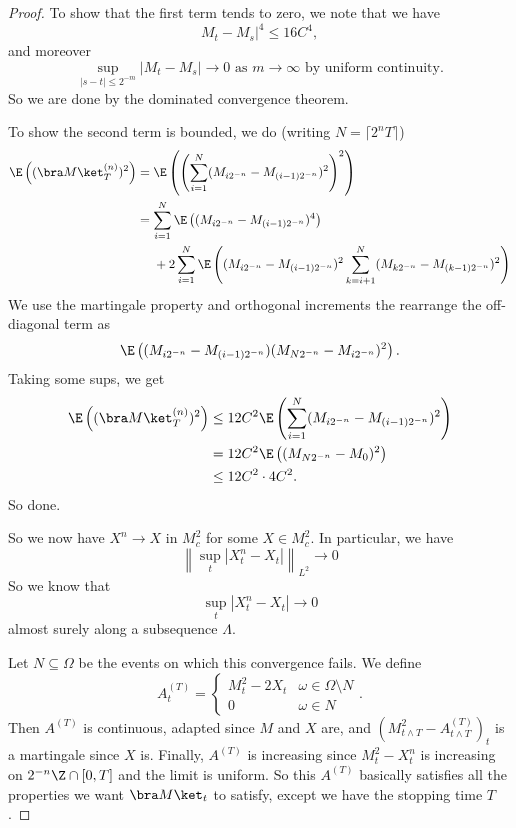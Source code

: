 \documentclass[a4paper]{article}
\begin{document}
\begin{proof}
  To show that the first term tends to zero, we note that we have
  \[
    M_t - M_s|^4 \leq 16 C^4,
  \]
  and moreover
  \[
    \sup_{|s - t| \leq 2^{-m}} |M_t - M_s| \to 0\text{ as }m \to \infty\text{ by uniform continuity}.
  \]
  So we are done by the dominated convergence theorem.

  To show the second term is bounded, we do (writing $N = \lceil 2^n T\rceil$)
  \begin{align*}
    \E\left((\bra M\ket_T^{(n)})^2\right) &= \E \left(\left(\sum_{i = 1}^{N} (M_{i 2^{-n}} - M_{(i - 1)2^{-n}})^2 \right)^2\right)\\
    &= \sum_{i = 1}^N \E \left( (M_{i 2^{-n}}- M_{(i - 1)2^{-n}})^4\right) \\
    &\hphantom{ {}={}} + 2 \sum_{i = 1}^N\E \left((M_{i 2^{-n}} - M_{(i - 1)2^{-n}})^2 \sum_{k = i + 1}^N (M_{k2^{-n}} - M_{(k - 1)2^{-n}})^2\right)
  \end{align*}
  We use the martingale property and orthogonal increments the rearrange the off-diagonal term as
  \[
    \E\left((M_{i2^{-n}} - M_{(i - 1)2^{-n}})(M_{N2^{-n}} - M_{i 2^{-n}})^2\right).
  \]
  Taking some sups, we get
  \begin{align*}
    \E\left((\bra M\ket_T^{(n)})^2\right) &\leq 12 C^2 \E \left(\sum_{i = 1}^N (M_{i 2^{-n}} - M_{(i - 1)2^{-n}})^2\right)\\
    &= 12C^2 \E \left((M_{N 2^{-n}} - M_0)^2\right)\\
    &\leq 12 C^2 \cdot 4 C^2.
  \end{align*}
  So done.

  So we now have $X^n \to X$ in $M^2_c$ for some $X \in M_c^2$. In particular, we have
  \[
    \left\|\sup_t |X_t^n - X_t|\right\|_{L^2} \to 0
  \]
  So we know that
  \[
    \sup_t |X_t^n - X_t| \to 0
  \]
  almost surely along a subsequence $\Lambda$.

  Let $N \subseteq \Omega$ be the events on which this convergence fails. We define
  \[
    A_t^{(T)} =
    \begin{cases}
      M_t^2 - 2X_t& \omega \in \Omega \setminus N\\
      0 & \omega \in N
    \end{cases}.
  \]
  Then $A^{(T)}$ is continuous, adapted since $M$ and $X$ are, and $(M_{t \wedge T}^2 - A^{(T)}_{t \wedge T})_t$ is a martingale since $X$ is. Finally, $A^{(T)}$ is increasing since $M_t^2 - X_t^n$ is increasing on $2^{-n} \Z \cap [0, T]$ and the limit is uniform. So this $A^{(T)}$ basically satisfies all the properties we want $\bra M\ket_t$ to satisfy, except we have the stopping time $T$.


\end{proof}
\end{document}
